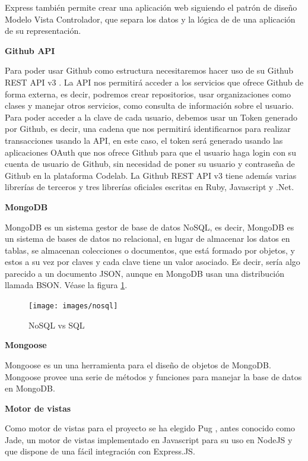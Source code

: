 Express también permite crear una aplicación web siguiendo el patrón de diseño Modelo Vista Controlador, que separa los datos y la lógica de de una aplicación de su representación.

{\bf Github API}

Para poder usar Github como estructura necesitaremos hacer uso de su Github REST API v3 \cite {B3}. 
La API nos permitirá acceder a los servicios que ofrece Github de forma externa, es decir, podremos crear repositorios, usar organizaciones como clases y manejar otros servicios, como consulta de información sobre el usuario.
Para poder acceder a la clave de cada usuario, debemos usar un Token generado por Github, es decir, una cadena que nos permitirá  identificarnos para realizar transacciones usando la API, en este caso, el token será generado 
usando las aplicaciones OAuth que nos ofrece Github para que el usuario haga login con su cuenta de usuario de Github, sin necesidad de poner su usuario y contraseña de Github en la plataforma Codelab.
La Github REST API v3 tiene además varias librerías de terceros y tres librerías oficiales escritas en Ruby, Javascript y .Net.

{\bf MongoDB}

MongoDB \cite{B9} es un sistema gestor de base de datos NoSQL, es decir,
MongoDB es un sistema de bases de datos no relacional, en lugar de
almacenar los datos en tablas, se almacenan colecciones o documentos,
que está formado por objetos, y estos a su vez por claves y cada
clave tiene un valor asociado. Es decir, sería algo parecido a un
documento JSON, aunque en MongoDB usan una distribución llamada
BSON. Véase la figura \ref{fig:NoSQLvsSQL}.

\begin{figure}[!th]
\begin{center}
\texttt{[image: images/nosql]}
\caption{NoSQL vs SQL}
\label{fig:NoSQLvsSQL}
\end{center}
\end{figure}

{\bf Mongoose}

Mongoose \cite{B8} es un una herramienta para el diseño de objetos de MongoDB. 
Mongoose provee una serie de métodos y funciones para manejar la base de datos en MongoDB.

{\bf Motor de vistas}

Como motor de vistas para el proyecto se ha elegido Pug \cite{B7}, antes conocido como Jade, un motor de vistas implementado en Javascript para su uso en NodeJS y que dispone de una fácil integración con Express.JS. 

